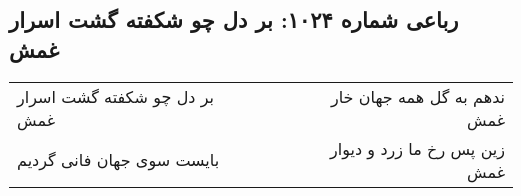\begin{center}
\section*{رباعی شماره ۱۰۲۴: بر دل چو شکفته گشت اسرار غمش}
\label{sec:1024}
\begin{longtable}{l p{0.5cm} r}
بر دل چو شکفته گشت اسرار غمش
&&
ندهم به گل همه جهان خار غمش
\\
بایست سوی جهان فانی گردیم
&&
زین پس رخ ما زرد و دیوار غمش
\\
\end{longtable}
\end{center}
